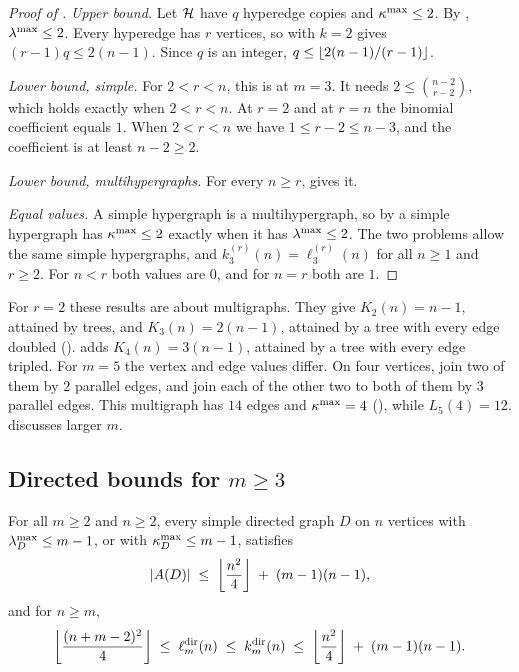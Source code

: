 \begin{proof}[Proof of ]
\emph{Upper bound.}
Let $\mathcal{H}$ have $q$ hyperedge copies and $\kappa^{\max} \le 2$.
By , $\lambda^{\max} \le 2$.
Every hyperedge has $r$ vertices, so  with $k = 2$ gives $(r-1)q \le 2(n-1)$.
Since $q$ is an integer, $q \le \left\lfloor 2(n-1)/(r-1) \right\rfloor$.

\emph{Lower bound, simple.}
For $2 < r < n$, this is  at $m = 3$. It needs $2 \le \binom{n-2}{r-2}$, which holds exactly when $2 < r < n$. At $r=2$ and at $r=n$ the binomial coefficient equals $1$. When $2<r<n$ we have $1\le r-2\le n-3$, and the coefficient is at least $n-2\ge2$.

\emph{Lower bound, multihypergraphs.}
For every $n \ge r$,  gives it.

\emph{Equal values.}
A simple hypergraph is a multihypergraph, so by  a simple hypergraph has $\kappa^{\max} \le 2$ exactly when it has $\lambda^{\max} \le 2$.
The two problems allow the same simple hypergraphs, and $k_3^{(r)}(n) = \ell_3^{(r)}(n)$ for all $n \ge 1$ and $r \ge 2$.
For $n < r$ both values are $0$, and for $n = r$ both are $1$.
\end{proof}

For $r=2$ these results are about multigraphs.
They give $K_2(n)=n-1$, attained by trees, and $K_3(n)=2(n-1)$, attained by a tree with every edge doubled ().
 adds $K_4(n)=3(n-1)$, attained by a tree with every edge tripled.
For $m=5$ the vertex and edge values differ. On four vertices, join two of them by $2$ parallel edges, and join each of the other two to both of them by $3$ parallel edges. This multigraph has $14$ edges and $\kappa^{\max}=4$ (), while $L_5(4)=12$.
 discusses larger $m$.

\subsection{Directed bounds for \texorpdfstring{$m\ge3$}{m>=3}}

\begin{theorem}\label{thm:dir-arc-linear-error}
For all $m \ge 2$ and $n \ge 2$, every simple directed graph $D$ on $n$ vertices with $\lambda^{\max}_D \le m-1$, or with $\kappa^{\max}_D \le m-1$, satisfies
\[
    |A(D)| \;\le\; \left\lfloor \frac{n^2}{4} \right\rfloor \;+\; (m-1)(n-1),
\]
and for $n\ge m$,
\[
    \left\lfloor \frac{(n+m-2)^2}{4} \right\rfloor \;\le\; \ell_m^{\mathrm{dir}}(n) \;\le\; k_m^{\mathrm{dir}}(n) \;\le\; \left\lfloor \frac{n^2}{4} \right\rfloor \;+\; (m-1)(n-1).
\]
\end{theorem}


